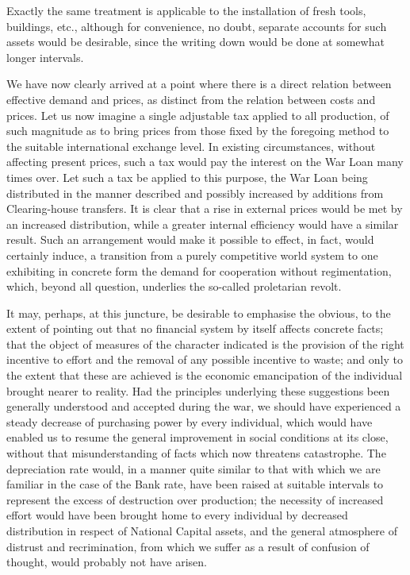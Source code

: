 \documentclass{book}
\begin{document}
Exactly the same treatment is applicable to the installation of fresh tools, buildings, etc., although for convenience, no doubt, separate accounts for such assets would be desirable, since the writing down would be done at somewhat longer intervals.

We have now clearly arrived at a point where there is a direct relation between effective demand and prices, as distinct from the relation between costs and prices. Let us now imagine a single adjustable tax applied to all production, of such magnitude as to bring prices from those fixed by the foregoing method to the suitable international exchange level. In existing circumstances, without affecting present prices, such a tax would pay the interest on the War Loan many times over. Let such a tax be applied to this purpose, the War Loan being distributed in the manner described and possibly increased by additions from Clearing-house transfers. It is clear that a rise in external prices would be met by an increased distribution, while a greater internal efficiency would have a similar result. Such an arrangement would make it possible to effect, in fact, would certainly induce, a transition from a purely competitive world system to one exhibiting in concrete form the demand for cooperation without regimentation, which, beyond all question, underlies the so-called proletarian revolt.

It may, perhaps, at this juncture, be desirable to emphasise the obvious, to the extent of pointing out that no financial system by itself affects concrete facts; that the object of measures of the character indicated is the provision of the right incentive to effort and the removal of any possible incentive to waste; and only to the extent that these are achieved is the economic emancipation of the individual brought nearer to reality. Had the principles underlying these suggestions been generally understood and accepted during the war, we should have experienced a steady decrease of purchasing power by every individual, which would have enabled us to resume the general improvement in social conditions at its close, without that misunderstanding of facts which now threatens catastrophe. The depreciation rate would, in a manner quite similar to that with which we are familiar in the case of the Bank rate, have been raised at suitable intervals to represent the excess of destruction over production; the necessity of increased effort would have been brought home to every individual by decreased distribution in respect of National Capital assets, and the general atmosphere of distrust and recrimination, from which we suffer as a result of confusion of thought, would probably not have arisen.
\end{document}
